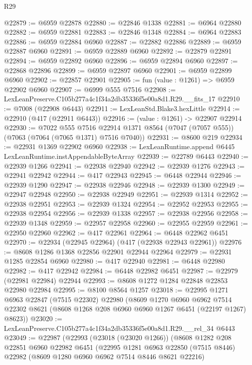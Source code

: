 \begin{lexlean}{R29}
\begin{coremodule}
@22879 := @6959 @22878
@22880 := @22846 @1338
@22881 := @6964 @22880
@22882 := @6959 @22881
@22883 := @22846 @1348
@22884 := @6964 @22883
@22886 := @6959 @22884 @6960
@22887 := @22882 @22886
@22889 := @6959 @22887 @6960
@22891 := @6959 @22889 @6960
@22892 := @22879 @22891
@22894 := @6959 @22892 @6960
@22896 := @6959 @22894 @6960
@22897 := @22868 @22896
@22899 := @6959 @22897 @6960
@22901 := @6959 @22899 @6960
@22902 := @22857 @22901
@22905 := fun (value : @1261) => @6959 @22902 @6960
@22907 := @6999 @555 @7516
@22908 := LexLeanPreserve.C105b277a4c1f34a2db35336f5e00a8d1.R29.__fits_17
@22910 := @7008 (@22908 @6443)
@22911 := LexLeanStd.Blake3.hexLittle
@22914 := @22910 (@417 (@22911 @6443))
@22916 := (value : @1261) -> @22907 @22914
@22930 := @7022
    @555
    @7516
    @22914
    @1371
    @8564
    (@7047 (@7057 @555))
    (@7063 (@7064 (@7065 @1371) @7516 @7040))
@22931 := @8600 @219
@22934 := @22931 @1369 @22902 @6960
@22938 := LexLeanRuntime.append @6445 LexLeanRuntime.instAppendableByteArray
@22939 := @22789 @6443
@22940 := @22939 @1266
@22941 := @22938 @22940
@22942 := @22939 @1276
@22943 := @22941 @22942
@22944 := @417 @22943
@22945 := @6448 @22944
@22946 := @22939 @1290
@22947 := @22938 @22946
@22948 := @22939 @1300
@22949 := @22947 @22948
@22950 := @22938 @22949
@22951 := @22939 @1314
@22952 := @22938 @22951
@22953 := @22939 @1324
@22954 := @22952 @22953
@22955 := @22938 @22954
@22956 := @22939 @1338
@22957 := @22938 @22956
@22958 := @22939 @1348
@22959 := @22957 @22958
@22960 := @22955 @22959
@22961 := @22950 @22960
@22962 := @417 @22961
@22964 := @6448 @22962 @6451
@22970 := @22934 (@22945 @22964) (@417 (@22938 @22943 @22961))
@22976 := @8608 @1286 @1368 @22856 @22901 @22944 @22964
@22979 := @22931 @1285 @22854 @6960
@22980 := @417 @22940
@22981 := @6448 @22980
@22982 := @417 @22942
@22984 := @6448 @22982 @6451
@22987 := @22979 (@22981 @22984) @22944
@22993 := @8608 @1272 @1284 @22848 @22853 @22980 @22984
@22995 := @8100 @8564 @1257
@23018 := @22995
    @1271
    @6963
    @22847
    (@7515 @22302)
    @22980
    (@8609
      @1270
      @6960
      @6962
      @7514
      @22302
      @8621
      (@8608 @1268 @208 @6960 @6960 @1267 @6451 (@22197 @1267) @8623))
@23020 := LexLeanPreserve.C105b277a4c1f34a2db35336f5e00a8d1.R29.__rel_34 @6443
@23049 := @22987
    (@22993
      (@23018 (@23020 @1266))
      (@8608
        @1282
        @208
        @22851
        @6960
        @22982
        @6451
        (@22995
          @1281
          @6963
          @22850
          (@7515 @8446)
          @22982
          (@8609 @1280 @6960 @6962 @7514 @8446 @8621 @22216)

\end{coremodule}
\end{lexlean}
